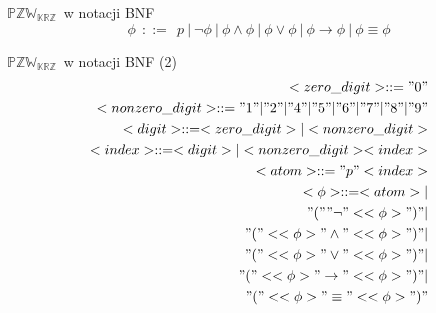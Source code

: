 \documentclass{beamer}
\newtheorem{definicja}{Definicja}
\newcommand {\PZWKRZ} {\ensuremath{\mathbb{PZW_{KRZ}}}}
\begin{document}
%
%

\begin{frame}{\PZWKRZ\ w notacji BNF}
%
\begin{equation}
\phi ~~::=~~ p ~|~ \neg \phi ~|~ \phi \land \phi ~|~ \phi \lor \phi ~|~ \phi \to \phi ~|~ \phi \equiv \phi
\end{equation}
\end{frame}

\begin{frame}{\PZWKRZ\ w notacji BNF (2)}
%
\begin{eqnarray}
<zero\_digit> :: = "0" \\ %
<nonzero\_digit> :: = "1" | "2" | "4" | "5" | "6" | "7" | "8" | "9" \\ %
<digit> :: = <zero\_digit> | <nonzero\_digit> \\ %
<index> :: = <digit> | <nonzero\_digit><index> \\ %
<atom> ::= "p"<index> \\  %
<\phi> ::= <atom> | \nonumber  \\
"(" "\neg"  <<\phi> ")" | \nonumber \\
"(" <<\phi> "\land" <<\phi> ")" | \nonumber \\
"(" <<\phi> "\lor" <<\phi> ")" | \nonumber  \\
"(" <<\phi> "\to" <<\phi> ")" | \nonumber  \\
"(" <<\phi> "\equiv" <<\phi> ")"
\end{eqnarray}
\end{frame}
\end{document}
